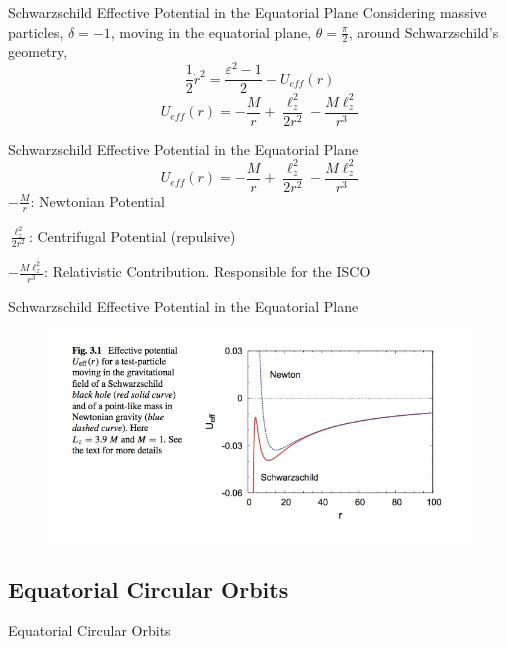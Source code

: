 \documentclass{beamer}
\begin{document}
\begin{frame}{Schwarzschild Effective Potential in the Equatorial Plane}
	Considering massive particles, $\delta = -1$, moving in the equatorial plane, $ \theta = \frac{\pi}{2} $, around Schwarzschild's geometry,
	\pause
	\[ \frac{1}{2} \dot{r}^2 = \frac{\varepsilon^2 -1}{2} - U_{eff} (r) \]
	\pause	
	\[ U_{eff} (r) = -\frac{M}{r} + \frac{\ell_z^2}{2r^2} - \frac{M\ell_z^2}{r^3} \]
\end{frame}

\begin{frame}{Schwarzschild Effective Potential in the Equatorial Plane}	
	\[ U_{eff} (r) = -\frac{M}{r} + \frac{\ell_z^2}{2r^2} - \frac{M\ell_z^2}{r^3} \]
	\pause
	$-\frac{M}{r}$: Newtonian Potential
	\bigskip
	\pause
	
	$\frac{\ell_z^2}{2r^2}$: Centrifugal Potential (repulsive)
	\bigskip
	\pause
	
	$- \frac{M\ell_z^2}{r^3}$: Relativistic Contribution. Responsible for the ISCO
\end{frame}

\begin{frame}{Schwarzschild Effective Potential in the Equatorial Plane}
	\begin{center}
      \begin{figure}
      	\includegraphics[scale=0.4] {figures/scheffpot.jpeg}
      \end{figure}
	\end{center}	
\end{frame}

\subsection{Equatorial Circular Orbits}
\begin{frame}
	\huge
    Equatorial Circular Orbits
\end{frame}
\end{document}
